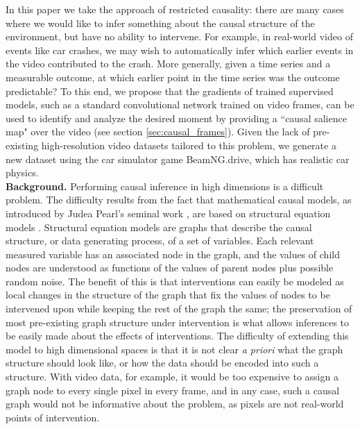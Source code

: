 \documentclass[letterpaper, twocolumn]{article} %
\begin{document}
In this paper we take the approach of restricted causality: there are many cases where we would like to infer something about the causal structure of the environment, but have no ability to intervene. For example, in real-world video of events like car crashes, we may wish to automatically infer which earlier events in the video contributed to the crash. More generally, given a time series and a measurable outcome, at which earlier point in the time series was the outcome predictable? To this end, we propose that the gradients of trained supervised models, such as a standard convolutional network trained on video frames, can be used to identify and analyze the desired moment by providing a ``causal salience map" over the video (see section \ref{sec:causal_frames}). Given the lack of pre-existing high-resolution video datasets tailored to this problem, we generate a new dataset using the car simulator game BeamNG.drive, which has realistic car physics. \\


\noindent \textbf{Background.} Performing causal inference in high dimensions is a difficult problem. The difficulty results from the fact that mathematical causal models, as introduced by Judea Pearl's seminal work \cite{pearl2009causalitybook}, are based on structural equation models \cite{duncan2014introduction}. Structural equation models are graphs that describe the causal structure, or data generating process, of a set of variables.  Each relevant measured variable has an associated node in the graph, and the values of child nodes are understood as functions of the values of parent nodes plus possible random noise. The benefit of this is that interventions can easily be modeled as local changes in the structure of the graph that fix the values of nodes to be intervened upon while keeping the rest of the graph the same; the preservation of most pre-existing graph structure under intervention is what allows inferences to be easily made about the effects of interventions. The difficulty of extending this model to high dimensional spaces is that it is not clear \emph{a priori} what the graph structure should look like, or how the data should be encoded into such a structure. With video data, for example, it would be too expensive to assign a graph node to every single pixel in every frame, and in any case, such a causal graph would not be informative about the problem, as pixels are not real-world points of intervention.
\end{document}
